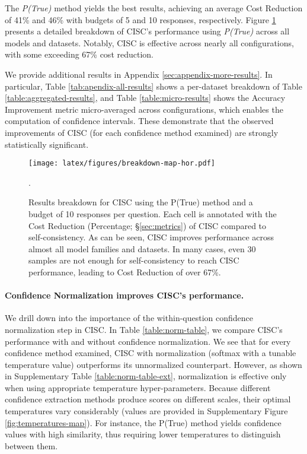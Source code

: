 The \textit{P(True)} method yields the best results, achieving an average Cost Reduction of 41\% and 46\% with budgets of 5 and 10 responses, respectively. Figure \ref{fig:intrinsic-binary-results} presents a detailed breakdown of CISC's performance using \textit{P(True)} across all models and datasets. Notably, CISC is effective across nearly all configurations, with some exceeding 67\% cost reduction.

We provide additional results in Appendix \ref{sec:appendix-more-results}. In particular, Table \ref{tab:apendix-all-results} shows a per-dataset breakdown of Table \ref{table:aggregated-results}, and Table \ref{table:micro-results} shows the Accuracy Improvement metric micro-averaged across configurations, which enables the computation of confidence intervals. These demonstrate that the observed improvements of CISC (for each confidence method examined) are strongly statistically significant.

\begin{figure}[h]
    \centering
    \texttt{[image: latex/figures/breakdown-map-hor.pdf]}
    \caption{Results breakdown for CISC using the P(True) method and a budget of 10 responses per question. Each cell is annotated with the Cost Reduction (Percentage; \S\ref{sec:metrics}) of CISC compared to self-consistency. As can be seen, CISC improves performance across almost all model families and datasets. In many cases, even 30 samples are not enough for self-consistency to reach CISC performance, leading to Cost Reduction of over 67\%. }.
    \label{fig:intrinsic-binary-results}
\end{figure}

\paragraph{Confidence Normalization improves CISC's performance.} We drill down into the importance of the within-question confidence normalization step in CISC. In Table \ref{table:norm-table}, we compare CISC's performance with and without confidence normalization. We see that for every confidence method examined, CISC with normalization (softmax with a tunable temperature value) outperforms its unnormalized counterpart. However, as shown in Supplementary Table \ref{table:norm-table-ext}, normalization is effective only when using appropriate temperature hyper-parameters. Because different confidence extraction methods produce scores on different scales, their optimal temperatures vary considerably (values are provided in Supplementary Figure \ref{fig:temperatures-map}). For instance, the P(True) method yields confidence values with high similarity, thus requiring lower temperatures to distinguish between them.

